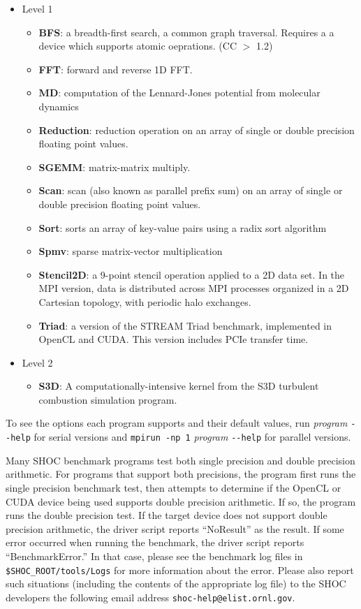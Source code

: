 \documentclass[11pt]{article}
\begin{document}
\begin{itemize}
\item Level 1
    \begin{itemize}
        \item {\bf BFS}: a breadth-first search, a common graph traversal. Requires a
		a device which supports atomic oeprations. (CC $>$ 1.2)
        \item {\bf FFT}: forward and reverse 1D FFT.
        \item {\bf MD}: computation of the Lennard-Jones potential from
        molecular dynamics
        \item {\bf Reduction}: reduction operation on an array of single
        or double precision floating point values.
        \item {\bf SGEMM}: matrix-matrix multiply.
        \item {\bf Scan}: scan (also known as parallel prefix sum) on an array 
        of single or double precision floating point values.
        \item {\bf Sort}: sorts an array of key-value pairs using a radix sort 
        algorithm
        \item {\bf Spmv}: sparse matrix-vector multiplication
        \item {\bf Stencil2D}: a 9-point stencil operation applied to a 2D data
        set. In the MPI version, data is distributed across MPI processes
        organized in a 2D Cartesian topology, with periodic halo exchanges.
        \item {\bf Triad}: a version of the STREAM Triad benchmark, implemented 
        in OpenCL and CUDA. This version includes PCIe transfer time.
    \end{itemize}
\item{Level 2}
    \begin{itemize}
        \item {\bf S3D}: A computationally-intensive kernel from the 
        S3D turbulent combustion simulation program\cite{s3d}.
    \end{itemize}
\end{itemize}
    
To see the options each program supports and their default values, run 
{\it program} \verb+--help+ for serial versions and \verb+mpirun -np 1+ {\it program} \verb+--help+
for parallel versions.

Many SHOC benchmark programs test both single precision and double precision
arithmetic.
For programs that support both precisions, the program first runs the
single precision benchmark test, then attempts to determine if the 
OpenCL or CUDA device being used supports double precision arithmetic.
If so, the program runs the double precision test.
If the target device does not support double precision arithmetic, the 
driver script reports ``NoResult'' as the result.
If some error occurred when running the benchmark, the driver script reports
``BenchmarkError.''
In that case, please see the benchmark log files in 
{\tt\$SHOC\_ROOT/tools/Logs} for more information about the error.
Please also report such situations (including the contents of the appropriate
log file) to the SHOC developers the following email address 
\verb+shoc-help@elist.ornl.gov+.
\end{document}
